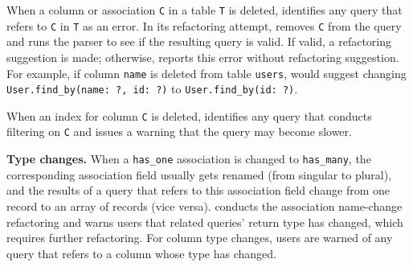 When a column or association \texttt{C} in a table \texttt{T} is deleted, 
\Tool{} identifies any query that refers to \texttt{C} in \texttt{T} as an error.
In its refactoring attempt, \Tool removes \texttt{C} from
the query and runs the parser to see if the resulting query is valid.
If valid, a refactoring suggestion is made; otherwise, \Tool
reports this error without refactoring suggestion.  
For example, if column \texttt{name} is deleted from table \texttt{users}, \Tool would
suggest changing \texttt{User.find\_by(name: ?, id: ?)} to \texttt{User.find\_by(id: ?)}.

When an index for column \texttt{C} is deleted, 
\Tool identifies any query that conducts filtering on \texttt{C} and issues a
warning that the query may become slower.


\textbf{Type changes.}
When a \texttt{has\_one} association is changed to \texttt{has\_many}, 
the corresponding association field usually gets renamed
(from singular to plural),
and
the results of a query that refers to this association field
change from one record to an array of records (vice versa). \Tool{} conducts
the association name-change refactoring and warns users that related queries'
return type has changed, which requires further refactoring.
For column type changes, users are warned of any query that refers to a column whose type has changed. 
